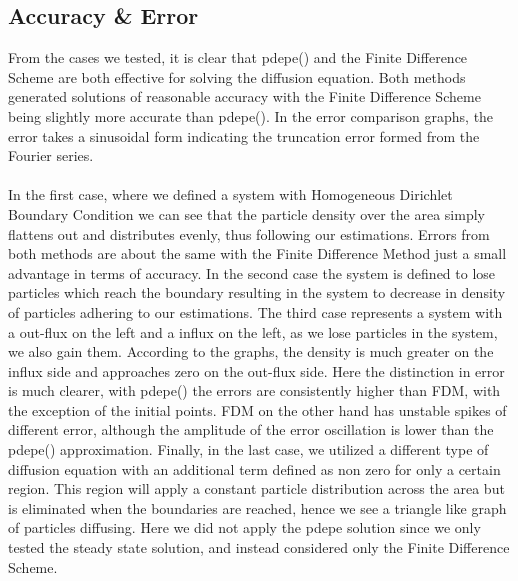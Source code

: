 \documentclass{article}
\begin{document}
\subsection{Accuracy \& Error}
From the cases we tested, it is clear that pdepe() and the Finite Difference Scheme are both effective for solving the diffusion equation. Both methods generated solutions of reasonable accuracy with the Finite Difference Scheme being slightly more accurate than pdepe(). In the error comparison graphs, the error takes a sinusoidal form indicating the truncation error formed from the Fourier series.
\\
\\
In the first case, where we defined a system with Homogeneous Dirichlet Boundary Condition we can see that the particle density over the area simply flattens out and distributes evenly, thus following our estimations. Errors from both methods are about the same with the Finite Difference Method just a small advantage in terms of accuracy. In the second case the system is defined to lose particles which reach the boundary resulting in the system to decrease in density of particles adhering to our estimations. The third case represents a system with a out-flux on the left and a influx on the left, as we lose particles in the system, we also gain them. According to the graphs, the density is much greater on the influx side and approaches zero on the out-flux side. Here the distinction in error is much clearer, with pdepe() the errors are consistently higher than FDM, with the exception of the initial points. FDM on the other hand has unstable spikes of different error, although the amplitude of the error oscillation is lower than the pdepe() approximation. Finally, in the last case, we utilized a different type of diffusion equation with an additional term defined as non zero for only a certain region. This region will apply a constant particle distribution across the area but is eliminated when the boundaries are reached, hence we see a triangle like graph of particles diffusing. Here we did not apply the pdepe solution since we only tested the steady state solution, and instead considered only the Finite Difference Scheme.
\end{document}
